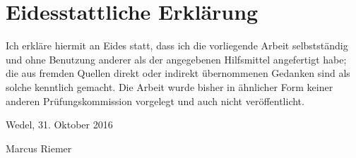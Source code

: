 \section{Eidesstattliche Erklärung}
Ich erkl\"are hiermit an Eides statt, dass ich die vorliegende Arbeit selbstst\"andig und ohne Benutzung anderer als der angegebenen Hilfsmittel angefertigt habe; die aus fremden Quellen direkt oder indirekt \"ubernommenen Gedanken sind als solche kenntlich gemacht. Die Arbeit wurde bisher in \"ahnlicher Form keiner anderen Pr\"ufungskommission vorgelegt und auch nicht ver\"offentlicht.

\bigskip
\bigskip
\bigskip
\bigskip
	
\begin{multicols}{2}
  \raggedright
  Wedel, 31. Oktober 2016
  
  \raggedleft
  Marcus Riemer
\end{multicols}
